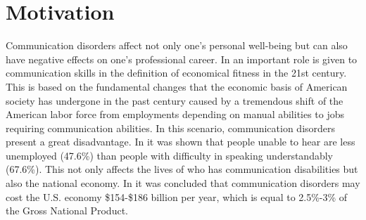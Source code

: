 \begin{comment}
\begin{figure}
    \centering
    \texttt{[image: diagramProject.pdf]}
    \caption{Overview of the project BioVisualSpeech.}
    \label{fig:project}
\end{figure}

Study case 2) was chosen as several datasets for expression detection are available and a taxonomy for facial movements is available in this area. As in study case 1) also facial movements have to be extracted and represented, the goal is to learn the state-of-the-art in expression detection in order to apply it to study case 1).

Study case 3) is similar to study case 1) with the difference that there is no pathology concerning speech. However, neurological diseases can cause facial paralysis which are visible and which disturb speech production and non-verbal communication. Through physiotherapy during several weeks, the gravity of the paralysis can be reduced. 

All three study cases have in common the video analysis of facial activity over a temporal window and it is expected that the same image processing and machine learning tools can be applied. In the following subchapters the motivation and impact will be described.  

\end{comment}


\section{Motivation} %
\label{sec:motivation}



Communication disorders affect not only one's personal well-being but can also have negative effects on one's professional career. In \cite{Ruben2000} an important role is given to communication skills in the definition of economical fitness in the 21st century. This is based on the fundamental changes that the economic basis of American society has undergone in the past century caused by a tremendous shift of the American labor force from employments depending on manual abilities to jobs requiring communication abilities. In this scenario, communication disorders present a great disadvantage. In \cite{Kruse1997} it was shown that people unable to hear are less unemployed (47.6\%) than people with difficulty in speaking understandably (67.6\%). This not only affects the lives of who has communication disabilities but also the national economy. In \cite{Ruben2000} it was concluded that communication disorders may cost the U.S. economy \$154-\$186 billion per year, which is equal to 2.5\%-3\% of the Gross National Product.


